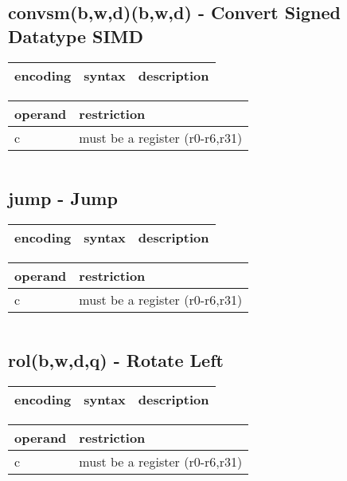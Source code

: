 \documentclass[letterpaper,10pt,openright,twoside,onecolumn]{book}
\begin{document}
\newpage\subsection{convsm(b,w,d)(b,w,d) - Convert Signed Datatype SIMD}
  \begin{tabular}{|l|l|l|}
   \hline
    encoding & syntax & description \\
   \hline
   \hline
  \end{tabular}
  \flushleft
  \begin{tabular}{|l|l|}
   \hline
    operand & restriction \\
   \hline
    c & must be a register (r0-r6,r31) \\
   \hline
  \end{tabular}
  \begin{verbatim}
  \end{verbatim}
\newpage\subsection{jump - Jump}
  \begin{tabular}{|l|l|l|}
   \hline
    encoding & syntax & description \\
   \hline
   \hline
  \end{tabular}
  \flushleft
  \begin{tabular}{|l|l|}
   \hline
    operand & restriction \\
   \hline
    c & must be a register (r0-r6,r31) \\
   \hline
  \end{tabular}
  \begin{verbatim}
  \end{verbatim}
\newpage\subsection{rol(b,w,d,q) - Rotate Left}
  \begin{tabular}{|l|l|l|}
   \hline
    encoding & syntax & description \\
   \hline
   \hline
  \end{tabular}
  \flushleft
  \begin{tabular}{|l|l|}
   \hline
    operand & restriction \\
   \hline
    c & must be a register (r0-r6,r31) \\
   \hline
  \end{tabular}
  \begin{verbatim}
  \end{verbatim}
\end{document}

